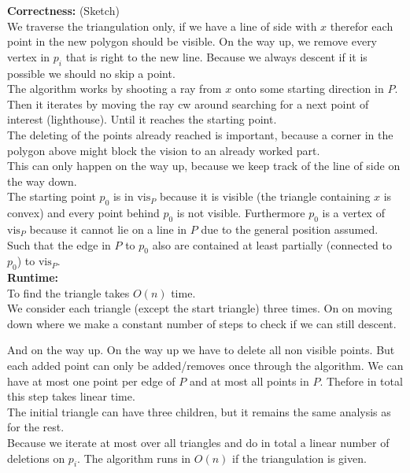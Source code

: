 \documentclass[11pt,a4paper,ngerman]{article}
\begin{document}
\textbf{Correctness:} (Sketch)\\

We traverse the triangulation only, if we have a line of side with $x$
therefor each point in the new polygon should be visible. On
the way up, we remove every vertex in $p_i$ that is right
to the new line. Because we always
descent if it is possible we should no skip a point.\\

The algorithm works by shooting a ray from $x$ onto some starting direction in $P$. Then it iterates by moving the ray cw around searching for a next point of interest (lighthouse). Until it reaches the starting point.\\

The deleting of the points already reached is important, because a corner
in the polygon above might block the vision to an already worked part.\\
This can only happen on the way up, because we keep track of the line of side
on the way down.\\

The starting point $p_0$ is in $\text{vis}_P$ because it is visible (the
triangle containing $x$ is convex) and every point behind $p_0$ is not visible.
Furthermore $p_0$ is a vertex of $\text{vis}_P$ because it cannot lie on a
line in $P$ due to the general position assumed. Such that the edge in $P$
to $p_0$ also are contained at least partially (connected to $p_0$) to $\text{vis}_P$.\\

\textbf{Runtime:}\\

To find the triangle takes $O(n)$ time.\\
We consider each triangle (except the start triangle) three times.
On on moving down where we make a constant number of steps to check
if we can still descent.

And on the way up. On the way up we have to delete all non visible points.
But each added point can only be added/removes once through the algorithm.
We can have at most one point per edge of $P$ and at most all points in $P$.
Thefore in total this step takes linear time.\\

The initial triangle can have three children, but it remains the same analysis
as for the rest.\\

Because we iterate at most over all triangles and do in total a linear
number of deletions on $p_i$. The algorithm
runs in $O(n)$ if the triangulation is given.
\end{document}
